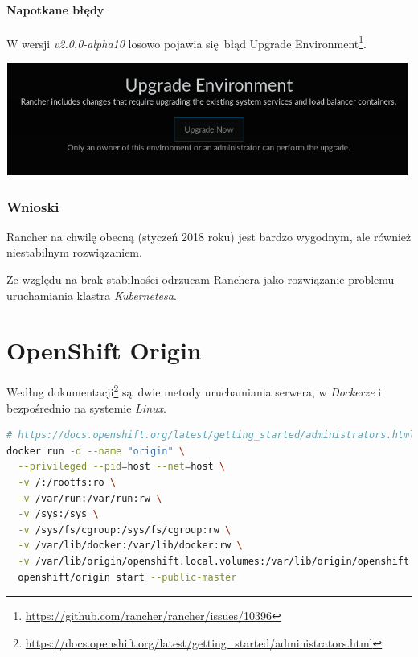 \documentclass[a4paper,12pt,twoside,openany]{report}
\DeclareRobustCommand{\href}[2]{#2\footnote{\url{#1}}}
\begin{document}
\hypertarget{napotkane-bux142ux119dy}{%
\paragraph{Napotkane błędy}\label{napotkane-bux142ux119dy}}

W wersji \emph{v2.0.0-alpha10} losowo pojawia się~błąd
\href{https://github.com/rancher/rancher/issues/10396}{Upgrade
Environment}.

\includegraphics[width=5.20833in,height=1.45833in]{assets/rancher2.0-error.png}\\

\hypertarget{wnioski-2}{%
\subsubsection{Wnioski}\label{wnioski-2}}

Rancher na chwilę obecną (styczeń 2018 roku) jest bardzo wygodnym, ale
również niestabilnym rozwiązaniem.

Ze względu na brak stabilności odrzucam Ranchera jako rozwiązanie
problemu uruchamiania klastra \emph{Kubernetesa}.

\hypertarget{openshift-origin-1}{%
\section{OpenShift Origin}\label{openshift-origin-1}}

Według
\href{https://docs.openshift.org/latest/getting_started/administrators.html}{dokumentacji}
są~dwie metody uruchamiania serwera, w \emph{Dockerze} i bezpośrednio na
systemie \emph{Linux}.

\begin{lstlisting}[language=bash]
# https://docs.openshift.org/latest/getting_started/administrators.html#installation-methods
docker run -d --name "origin" \
  --privileged --pid=host --net=host \
  -v /:/rootfs:ro \
  -v /var/run:/var/run:rw \
  -v /sys:/sys \
  -v /sys/fs/cgroup:/sys/fs/cgroup:rw \
  -v /var/lib/docker:/var/lib/docker:rw \
  -v /var/lib/origin/openshift.local.volumes:/var/lib/origin/openshift.local.volumes:rslave \
  openshift/origin start --public-master
\end{lstlisting}
\end{document}
